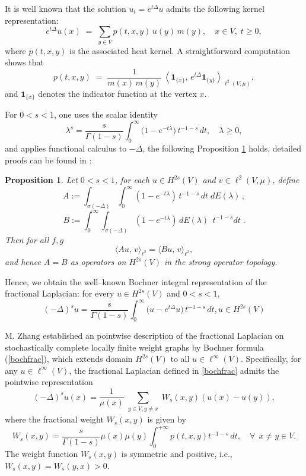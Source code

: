 \documentclass[reqno,12pt]{amsart}
\numberwithin{equation}{section}
\newtheorem{proposition}[theorem]{Proposition}
\begin{document}
It is well known that the solution \(u_t = e^{t\Delta}u\) admits the following kernel representation:
\[
e^{t\Delta}u(x)
\;=\;
\sum_{y\in V}p(t,x,y)\,u(y)\,m(y),
\quad x\in V,\;t\ge0,
\]
where \(p(t,x,y)\) is the associated heat kernel. A straightforward computation shows that
\[
p(t,x,y)
\;=\;
\frac{1}{m(x)\,m(y)}\,
\left\langle \mathbf{1}_{\{x\}},\,e^{t\Delta}\mathbf{1}_{\{y\}} \right\rangle_{\ell^2(V,\mu)},
\]
and \(\mathbf{1}_{\{x\}}\) denotes the indicator function at the vertex \(x\).


For \(0<s<1\), one uses the scalar identity
\[
\lambda^s
=\frac{s}{\Gamma(1-s)}
\int_0^\infty \bigl(1 - e^{-t\lambda}\bigr)\,t^{-1-s}\,dt,
\quad \lambda\ge0,
\]
and applies functional calculus to \(-\Delta\), the following Proposition \ref{fenshubo} holds, detailed proofs can be found in \cite[Proposition 2.10]{chen2025logarithmic}:


	\begin{proposition}\label{fenshubo}
	Let $0<s<1$, for each $u\in H^{2s}(V)$ and $v\in \ell^2(V,\mu)$, define
	\[
	A
	:=\int_{\sigma(-\Delta)}\!\int_{0}^{\infty}(1-e^{-t\lambda})\,t^{-1-s}\,dt\;dE(\lambda)\,,
	\]
	\[
	B 
	:=\int_{0}^{\infty}\!\int_{\sigma(-\Delta)}(1-e^{-t\lambda})\,dE(\lambda)\;\,t^{-1-s}dt\;.
	\]
	Then for all $f,g$
	\[
	\bigl\langle A u,\,v\bigr\rangle_{\ell^2}
	=\bigl\langle B u,\,v\bigr\rangle_{\ell^2},
	\]
	and hence $A=B$ as operators on $H^{2s}(V)$ in the strong operator topology.
\end{proposition}

Hence, we obtain the well–known Bochner integral representation of the fractional Laplacian: for every \(u\in H^{2s}(V)\) and \(0<s<1\),  
\begin{equation}\label{bochfrac}
	(-\Delta)^{s}u=\frac{s}{\Gamma(1-s)}
	\int_{0}^{\infty}\bigl(u-e^{t\Delta}u\bigr)\,t^{-1-s}\,dt,u\in H^{2s}(V)
\end{equation}

M. Zhang \cite{zhang2024fractional1} established an pointwise description of the fractional Laplacian on stochastically complete locally finite weight  graphs by Bochner formula (\ref{bochfrac}), which extends domain $H^{2s}\left(V\right)$ to all \(u\in \ell^\infty(V)\).  Specifically, for any \( u \in \ell^\infty(V) \), the fractional Laplacian defined in \eqref{bochfrac} admits the pointwise representation
\begin{equation} \label{eq:kernel-form}
	(-\Delta)^s u(x) = \frac{1}{\mu(x)} \sum_{\substack{y \in V , y \neq x}} W_s(x, y)(u(x) - u(y)),
\end{equation}
where the fractional weight \( W_s(x, y) \) is given by
\begin{equation} \label{eq:weight}
	W_s(x, y) = \frac{s}{\Gamma(1 - s)}\mu(x)\mu(y) \int_0^{+\infty} p(t, x, y) t^{-1-s} \, dt, \quad \forall \:\:x\ne y \in V.
\end{equation}
 The weight function \( W_s(x, y) \) is symmetric and positive, i.e., \( W_s(x, y) = W_s(y, x) > 0 \).
\end{document}
